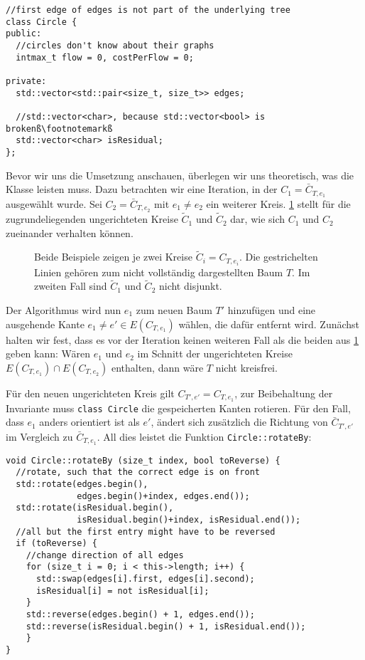 \begin{lstlisting}[escapechar=ß]
//first edge of edges is not part of the underlying tree
class Circle {
public:
  //circles don't know about their graphs
  intmax_t flow = 0, costPerFlow = 0;

private:
  std::vector<std::pair<size_t, size_t>> edges;
  
  //std::vector<char>, because std::vector<bool> is brokenß\footnotemarkß
  std::vector<char> isResidual;
};
\end{lstlisting}

Bevor wir uns die Umsetzung anschauen, überlegen wir uns theoretisch, was die Klasse leisten muss. Dazu betrachten wir eine Iteration, in der $C_1=\bar{C}_{T,e_1}$ ausgewählt wurde. Sei $C_2=\bar{C}_{T,e_2}$ mit $e_1\neq e_2$ ein weiterer Kreis. \cref{fig:circles} stellt für die zugrundeliegenden ungerichteten Kreise $\tilde{C}_1$ und $\tilde{C}_2$ dar, wie sich $C_1$ und $C_2$ zueinander verhalten können.


\begin{figure}[!ht]\centering
    
    \caption{Beide Beispiele zeigen je zwei Kreise $\tilde{C}_i=C_{T,e_i}$. Die gestrichelten Linien gehören zum nicht vollständig dargestellten Baum $T$. Im zweiten Fall sind $\tilde{C}_1$ und $\tilde{C}_2$ nicht disjunkt.}
    \label{fig:circles}
\end{figure}

Der Algorithmus wird nun $e_1$ zum neuen Baum $T'$ hinzufügen und eine ausgehende Kante $e_1\neq e'\in E(C_{T,e_1})$ wählen, die dafür entfernt wird. Zunächst halten wir fest, dass es vor der Iteration keinen weiteren Fall als die beiden aus \cref{fig:circles} geben kann: Wären $e_1$ und $e_2$ im Schnitt der ungerichteten Kreise $E(C_{T,e_1})\cap E(C_{T,e_2})$ enthalten, dann wäre $T$ nicht kreisfrei.

Für den neuen ungerichteten Kreis gilt $C_{T',e'}=C_{T,e_1}$, zur Beibehaltung der Invariante muss \lstinline|class Circle| die gespeicherten Kanten rotieren. Für den Fall, dass $e_1$ anders orientiert ist als $e'$, ändert sich zusätzlich die Richtung von $\bar{C}_{T',e'}$ im Vergleich zu $\bar{C}_{T,e_1}$. All dies leistet die Funktion \lstinline|Circle::rotateBy|:

\begin{lstlisting}
void Circle::rotateBy (size_t index, bool toReverse) {
  //rotate, such that the correct edge is on front
  std::rotate(edges.begin(),
              edges.begin()+index, edges.end());
  std::rotate(isResidual.begin(),
              isResidual.begin()+index, isResidual.end());
  //all but the first entry might have to be reversed
  if (toReverse) {
    //change direction of all edges
    for (size_t i = 0; i < this->length; i++) {
      std::swap(edges[i].first, edges[i].second);
      isResidual[i] = not isResidual[i];
    }
    std::reverse(edges.begin() + 1, edges.end());
    std::reverse(isResidual.begin() + 1, isResidual.end());
    }
}
\end{lstlisting}

